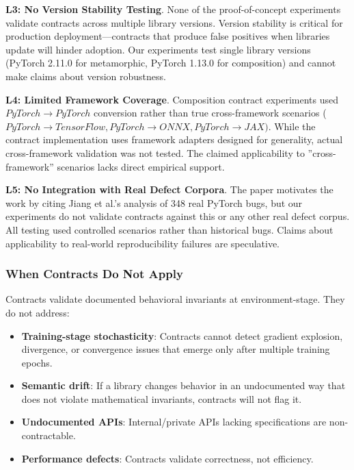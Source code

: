 \textbf{L3: No Version Stability Testing}. None of the proof-of-concept experiments validate contracts across multiple library versions. Version stability is critical for production deployment---contracts that produce false positives when libraries update will hinder adoption. Our experiments test single library versions (PyTorch 2.11.0 for metamorphic, PyTorch 1.13.0 for composition) and cannot make claims about version robustness.

\textbf{L4: Limited Framework Coverage}. Composition contract experiments used $PyTorch\rightarrow PyTorch$ conversion rather than true cross-framework scenarios ($PyTorch\rightarrow TensorFlow, PyTorch\rightarrow ONNX, PyTorch\rightarrow JAX)$. While the contract implementation uses framework adapters designed for generality, actual cross-framework validation was not tested. The claimed applicability to ''cross-framework'' scenarios lacks direct empirical support.

\textbf{L5: No Integration with Real Defect Corpora}. The paper motivates the work by citing Jiang et al.'s analysis of 348 real PyTorch bugs, but our experiments do not validate contracts against this or any other real defect corpus. All testing used controlled scenarios rather than historical bugs. Claims about applicability to real-world reproducibility failures are speculative.

\subsubsection{When Contracts Do Not Apply}

Contracts validate documented behavioral invariants at environment-stage. They do not address:

\begin{itemize}
\item \textbf{Training-stage stochasticity}: Contracts cannot detect gradient explosion, divergence, or convergence issues that emerge only after multiple training epochs.
\item \textbf{Semantic drift}: If a library changes behavior in an undocumented way that does not violate mathematical invariants, contracts will not flag it.
\item \textbf{Undocumented APIs}: Internal/private APIs lacking specifications are non-contractable.
\item \textbf{Performance defects}: Contracts validate correctness, not efficiency.
\end{itemize}


